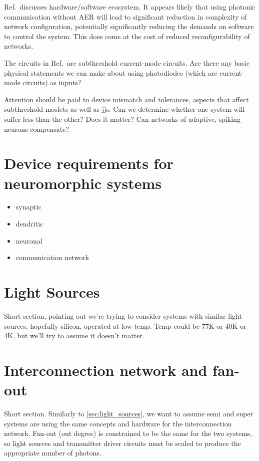 \documentclass[twocolumn]{article}
\begin{document}
Ref.\,\cite{chst2014} discusses hardware/software ecosystem. It appears likely that using photonic communication without AER will lead to significant reduction in complexity of network configuration, potentially significantly reducing the demands on software to control the system. This does come at the cost of reduced reconfigurability of networks.

The circuits in Ref.\,\cite{chst2014} are subthreshold current-mode circuits. Are there any basic physical statements we can make about using photodiodes (which are current-mode circuits) as inputs?

Attention should be paid to device mismatch and tolerances, aspects that affect subthreshold mosfets as well as jjs. Can we determine whether one system will suffer less than the other? Does it matter? Can networks of adaptive, spiking neurons compensate?

\section{\label{sec:neural_device_requirements}Device requirements for neuromorphic systems}
\begin{itemize}
\item synaptic
\item dendritic
\item neuronal
\item communication network
\end{itemize}
	
\section{\label{sec:light_sources}Light Sources}
Short section, pointing out we're trying to consider systems with similar light sources, hopefully silicon, operated at low temp. Temp could be 77K or 40K or 4K, but we'll try to assume it doesn't matter. 
	
\section{\label{sec:interconnection}Interconnection network and fan-out}
Short section. Similarly to \ref{sec:light_sources}, we want to assume semi and super systems are using the same concepts and hardware for the interconnection network. Fan-out (out degree) is constrained to be the same for the two systems, so light sources and transmitter driver circuits must be scaled to produce the appropriate number of photons.
\end{document}
